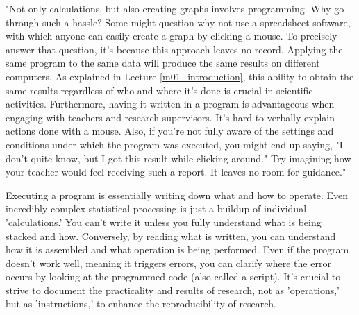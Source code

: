 \documentclass{ltjsbook}
\begin{document}
"Not only calculations, but also creating graphs involves programming. Why go through such a hassle? Some might question why not use a spreadsheet software, with which anyone can easily create a graph by clicking a mouse. To precisely answer that question, it's because this approach leaves no record. Applying the same program to the same data will produce the same results on different computers. As explained in Lecture \ref{m01_introduction}, this ability to obtain the same results regardless of who and where it's done is crucial in scientific activities. Furthermore, having it written in a program is advantageous when engaging with teachers and research supervisors. It's hard to verbally explain actions done with a mouse. Also, if you're not fully aware of the settings and conditions under which the program was executed, you might end up saying, "I don't quite know, but I got this result while clicking around." Try imagining how your teacher would feel receiving such a report. It leaves no room for guidance."


Executing a program is essentially writing down what and how to operate. Even incredibly complex statistical processing is just a buildup of individual 'calculations.' You can't write it unless you fully understand what is being stacked and how. Conversely, by reading what is written, you can understand how it is assembled and what operation is being performed. Even if the program doesn't work well, meaning it triggers errors, you can clarify where the error occurs by looking at the programmed code (also called a script). It's crucial to strive to document the practicality and results of research, not as 'operations,' but as 'instructions,' to enhance the reproducibility of research.
\end{document}
